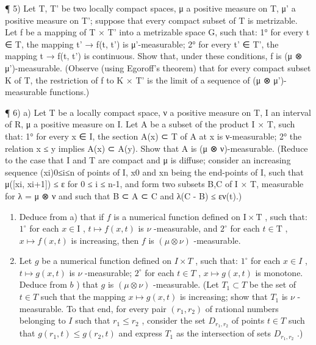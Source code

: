 ¶ 5) Let T, T' be two locally compact spaces, μ a positive measure on T, μ' a positive measure on T'; suppose that every compact subset of T is metrizable. Let f be a mapping of T × T' into a metrizable space G, such that: 1° for every t ∈ T, the mapping t' → f(t, t') is μ'-measurable; 2° for every t' ∈ T', the mapping t → f(t, t') is continuous. Show that, under these conditions, f is (μ ⊗ μ')-measurable. (Observe (using Egoroff's theorem) that for every compact subset K of T, the restriction of f to K × T' is the limit of a sequence of (μ ⊗ μ')-measurable functions.)

¶ 6) a) Let T be a locally compact space, ν a positive measure on T, I an interval of R, μ a positive measure on I. Let A be a subset of the product I × T, such that: 1° for every x ∈ I, the section A(x) ⊂ T of A at x is ν-measurable; 2° the relation x ≤ y implies A(x) ⊂ A(y). Show that A is (μ ⊗ ν)-measurable. (Reduce to the case that I and T are compact and μ is diffuse; consider an increasing sequence (xi)0≤i≤n of points of I, x0 and xn being the end-points of I, such that μ({[}xi, xi+1{]}) ≤ ε for 0 ≤ i ≤ n-1, and form two subsets B,C of I × T, measurable for λ = μ ⊗ ν and such that B ⊂ A ⊂ C and λ(C - B) ≤ εν(t).)

\begin{enumerate}
\def\labelenumi{\alph{enumi})}
\setcounter{enumi}{1}
\item
  Deduce from a) that if \(f\) is a numerical function defined on \(\mathrm{I} \times \mathrm{T}\) , such that: \(1^{\circ}\) for each \(x \in \mathrm{I}\) , \(t \mapsto f(x, t)\) is \(\nu\) -measurable, and \(2^{\circ}\) for each \(t \in \mathrm{T}\) , \(x \mapsto f(x, t)\) is increasing, then \(f\) is \((\mu \otimes \nu)\) -measurable.
\item
  Let \(g\) be a numerical function defined on \(I \times T\) , such that: \(1^{\circ}\) for each \(x \in I\) , \(t \mapsto g(x, t)\) is \(\nu\) -measurable; \(2^{\circ}\) for each \(t \in T\) , \(x \mapsto g(x, t)\) is monotone. Deduce from \(b\) ) that \(g\) is \((\mu \otimes \nu)\) -measurable. (Let \(T_1 \subset T\) be the set of \(t \in T\) such that the mapping \(x \mapsto g(x, t)\) is increasing; show that \(T_1\) is \(\nu\) -measurable. To that end, for every pair \((r_1, r_2)\) of rational numbers belonging to \(I\) such that \(r_1 \leqslant r_2\) , consider the set \(D_{r_1, r_2}\) of points \(t \in T\) such that \(g(r_1, t) \leqslant g(r_2, t)\) and express \(T_1\) as the intersection of sets \(D_{r_1, r_2}\) .)
\end{enumerate}

